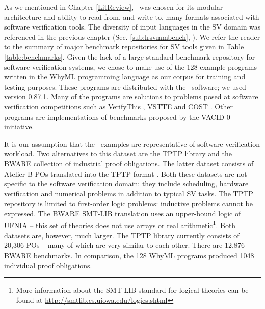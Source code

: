 As we mentioned in Chapter \ref{LitReview}, \why~was chosen for its modular architecture and ability to read from, and write to, many formats associated with software verification tools. The diversity of input languages in the SV domain was referenced in the previous chapter (Sec. \ref{sub:lrsvmmbench}, \cite{Dagstuhl, deductiveSV}). %
%
We refer the reader to the summary of major benchmark repositories for SV tools given in Table \ref{table:benchmarks}. 
Given the lack of a large standard benchmark repository for software verification systems, we chose to make use of the 128 example programs written in the WhyML programming language as our corpus for training and testing purposes. 
These programs are distributed with the \why~software; we used version 0.87.1. 
Many of the programs are solutions to problems posed at software verification competitions such as VerifyThis \cite{verifythis}, VSTTE \cite{Klebanov2011} and COST \cite{bormer:hal-00789525}. 
Other programs are implementations of benchmarks proposed by the VACID-0 \cite{Leino10vacid-0:verification} initiative.   

It is our assumption that the \why~examples are representative of software verification workload. Two alternatives to this dataset are the TPTP \cite{TPTP} library and the BWARE \cite{Delahaye2014} collection of industrial proof obligations. The latter dataset consists of Atelier-B  POs translated into the TPTP format \cite{atelierB2w}. Both these datasets are not specific to the software verification domain: they include scheduling, hardware verification and numerical problems in addition to typical SV tasks. The TPTP repository is limited to first-order logic problems: inductive problems cannot be expressed. The BWARE SMT-LIB translation uses an upper-bound logic of UFNIA -- this set of theories does not use arrays or real arithmetic\footnote{More information about the SMT-LIB standard for logical theories can be found at \url{http://smtlib.cs.uiowa.edu/logics.shtml} }. Both datasets are, however, much larger. The TPTP library currently consists of 20,306 POs \cite{TPTPsite} -- many of which are very similar to each other. There are 12,876 BWARE benchmarks. In comparison, the 128 WhyML programs produced 1048 individual proof obligations. 

